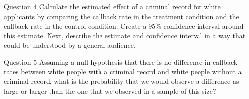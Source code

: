 \documentclass[presentation]{beamer}
\begin{document}
\begin{frame}[label={sec:org1f49e03}]{Question 4}
Calculate the estimated effect of a criminal record for white applicants by comparing the callback rate in the treatment condition and the callback rate in the control condition. Create a 95\% confidence interval around this estimate. Next, describe the estimate and confidence interval in a way that could be understood by a general audience.
\end{frame}

\begin{frame}[label={sec:org26dd554}]{Question 5}
Assuming a null hypothesis that there is no difference in callback rates between white people with a criminal record and white people without a criminal record, what is the probability that we would observe a difference as large or larger than the one that we observed in a sample of this size?
\end{frame}
\end{document}
